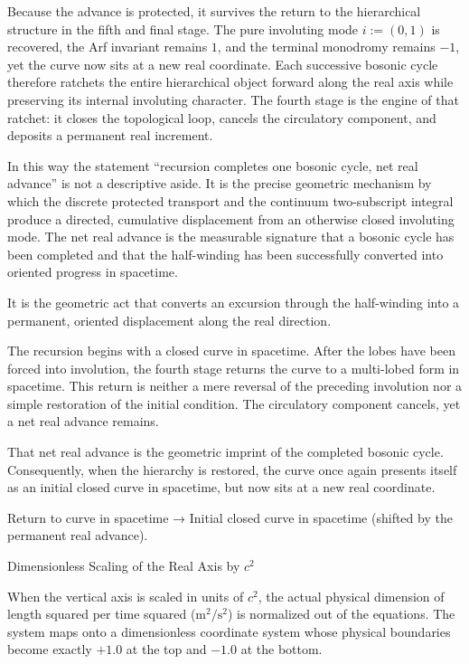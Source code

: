 Because the advance is protected, it survives the return to the hierarchical structure in the fifth and final stage. The pure involuting mode \(i:=(0,1)\) is recovered, the Arf invariant remains \(1\), and the terminal monodromy remains \(-1\), yet the curve now sits at a new real coordinate. Each successive bosonic cycle therefore ratchets the entire hierarchical object forward along the real axis while preserving its internal involuting character. The fourth stage is the engine of that ratchet: it closes the topological loop, cancels the circulatory component, and deposits a permanent real increment.

In this way the statement “recursion completes one bosonic cycle, net real advance” is not a descriptive aside. It is the precise geometric mechanism by which the discrete protected transport and the continuum two-subscript integral produce a directed, cumulative displacement from an otherwise closed involuting mode. The net real advance is the measurable signature that a bosonic cycle has been completed and that the half-winding has been successfully converted into oriented progress in spacetime.

It is the geometric act that converts an excursion through the half-winding into a permanent, oriented displacement along the real direction.

The recursion begins with a closed curve in spacetime. After the lobes have been forced into involution, the fourth stage returns the curve to a multi-lobed form in spacetime. This return is neither a mere reversal of the preceding involution nor a simple restoration of the initial condition. The circulatory component cancels, yet a net real advance remains.  

That net real advance is the geometric imprint of the completed bosonic cycle. Consequently, when the hierarchy is restored, the curve once again presents itself as an initial closed curve in spacetime, but now sits at a new real coordinate.

Return to curve in spacetime → Initial closed curve in spacetime (shifted by the permanent real advance).

Dimensionless Scaling of the Real Axis by \(c^2\)

When the vertical axis is scaled in units of \(c^2\), the actual physical dimension of length squared per time squared (\(\mathrm{m}^2/\mathrm{s}^2\)) is normalized out of the equations. The system maps onto a dimensionless coordinate system whose physical boundaries become exactly \(+1.0\) at the top and \(-1.0\) at the bottom.

